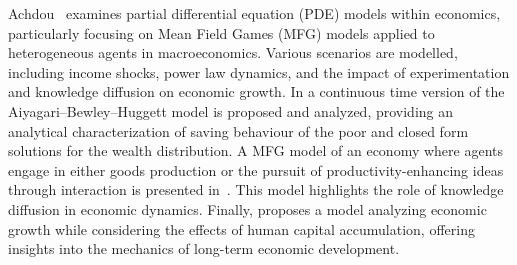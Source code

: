 Achdou~\cite{achdou2014partial} examines partial differential equation (PDE) models within economics, particularly focusing on Mean Field Games (MFG) models applied to heterogeneous agents in macroeconomics.
Various scenarios are modelled, including income shocks, power law dynamics, and the impact of experimentation and knowledge diffusion on economic growth. 
In \cite{achdou2022income} a continuous time version of the Aiyagari–Bewley–Huggett model is proposed and analyzed, providing an analytical characterization of saving behaviour of the poor and closed form solutions for the wealth distribution.
A MFG model of an economy where agents engage in either goods production or the pursuit of productivity-enhancing ideas through interaction is presented in~\cite{lucas2014knowledge}. This model highlights the role of knowledge diffusion in economic dynamics.
Finally, \cite{lucas1988mechanics} proposes a model analyzing economic growth while considering the effects of human capital accumulation, offering insights into the mechanics of long-term economic development. 
